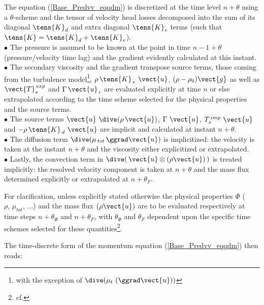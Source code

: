 The equation (\ref{Base_Predvv_eqqdm}) is discretized at the time level
$n+\theta$ using a $\theta$-scheme and the tensor of velocity head losses
decomposed into the sum of its diagonal $\tens{K}_{d}$ and extra diagonal $\tens{K}_{e}$ terms (such that
 $\tens{K}=\tens{K}_{d}+\tens{K}_{e}$).\\
$\bullet$ The pressure is assumed to be known at the point in time $n-1+\theta$
(pressure/velocity time lag) and the gradient evidently calculated at this instant.\\
$\bullet$ The secondary viscosity and the gradient transpose source terms,
those coming from the turbulence model\footnote{with the exception of $\dive (\mu_t\ (\ggrad
\vect {u}))$}, $\rho\,\tens{K}_{\,e}\ \vect{u}$, $(\rho -\rho_0)
\vect {g}$ as well as $\vect{T}_{s}^{\,exp}$ and
$\Gamma\,\vect{u}_{\,i}$ are evaluated explicitly at time $n$ or else
extrapolated according to the time scheme selected for the physical properties and the
source terms.\\
$\bullet$ The source terms $\vect{u}\,\,\dive (\rho\,\vect {u})$,
$\Gamma\,\,\vect{u}$, $T_{s}^{\,imp}\,\,\vect{u}$ and
$-\rho\,\tens{K}_{\,d}\,\,\vect{u}$ are implicit and calculated at
instant $n+\theta$.\\
$\bullet$ The diffusion term  $\dive (\mu_{\,tot}\,\ggrad \vect{u})$ is implicitized: the velocity is taken at the instant $n+\theta$ and the viscosity either explicitized or extrapolated.\\
$\bullet$ Lastly, the convection term in $\dive(\,\vect{u} \otimes
(\rho\vect{u})\,)$ is treated implicitly: the resolved velocity
component is
taken at $n+\theta$ and the mass flux determined explicitly or extrapolated
at
$n+\theta_F$.

For clarification, unless explicitly stated otherwise the physical properties
$\Phi$ ($\rho,\,\mu_{tot},\,...$) and the mass flux $(\rho\vect{u})$
are  to be evaluated respectively at time steps $n+\theta_\Phi$ and
$n+\theta_F$, with $\theta_\Phi$ and $\theta_F$ dependent upon the specific
time schemes selected for these quantities\footnote{cf. }.

The time-discrete form of the momentum equation (\ref{Base_Predvv_eqqdm}) then reads:

